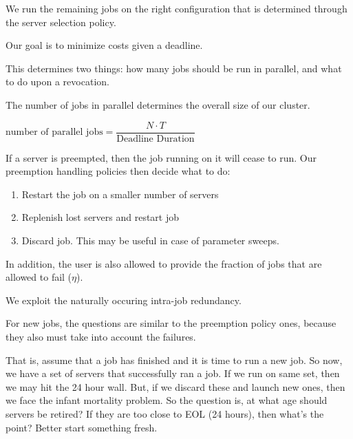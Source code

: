 
We run the remaining jobs on the right configuration that is determined through the server selection policy.

Our goal is to minimize costs given a deadline.

This determines two things: how many jobs should be run in parallel, and what to do upon a revocation.

The number of jobs in parallel determines the overall size of our cluster.

$\text{number of parallel jobs} = \dfrac{N\cdot T}{\text{Deadline Duration}}$

If a server is preempted, then the job running on it will cease to run.
Our preemption handling policies then decide what to do:
\begin{enumerate}
\item Restart the job on a smaller number of servers 
\item Replenish lost servers and restart job
\item Discard job. This may be useful in case of parameter sweeps. 
\end{enumerate}

In addition, the user is also allowed to provide the fraction of jobs that are allowed to fail ($\eta$).

We exploit the naturally occuring intra-job redundancy. 

For new jobs, the questions are similar to the preemption policy ones, because they also must take into account the failures.

That is, assume that a job has finished and it is time to run a new job. So now, we have a set of servers that successfully ran a job. If we run on same set, then we may hit the 24 hour wall. But, if we discard these and launch new ones, then we face the infant mortality problem. So the question is, at what age should servers be retired? If they are too close to EOL (24 hours), then what's the point? Better start something fresh.




